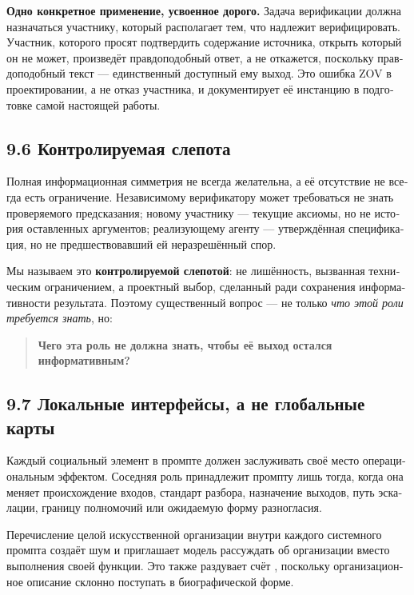 \begin{russian}
\textbf{Одно конкретное применение, усвоенное дорого.} Задача верификации должна назначаться участнику, который располагает тем, что надлежит верифицировать. Участник, которого просят подтвердить содержание источника, открыть который он не может, произведёт правдоподобный ответ, а не откажется, поскольку правдоподобный текст — единственный доступный ему выход. Это ошибка ZOV в проектировании, а не отказ участника, и  документирует её инстанцию в подготовке самой настоящей работы.


\subsection*{9.6 Контролируемая слепота}
\label{sec:ru:9.6}

Полная информационная симметрия не всегда желательна, а её отсутствие не всегда есть ограничение. Независимому верификатору может требоваться не знать проверяемого предсказания; новому участнику — текущие аксиомы, но не история оставленных аргументов; реализующему агенту — утверждённая спецификация, но не предшествовавший ей неразрешённый спор.

Мы называем это \textbf{контролируемой слепотой}: не лишённость, вызванная техническим ограничением, а проектный выбор, сделанный ради сохранения информативности результата. Поэтому существенный вопрос — не только \emph{что этой роли требуется знать}, но:

\begin{quote}
\textbf{Чего эта роль не должна знать, чтобы её выход остался информативным?}
\end{quote}

\subsection*{9.7 Локальные интерфейсы, а не глобальные карты}
\label{sec:ru:9.7}

Каждый социальный элемент в промпте должен заслуживать своё место операциональным эффектом. Соседняя роль принадлежит промпту лишь тогда, когда она меняет происхождение входов, стандарт разбора, назначение выходов, путь эскалации, границу полномочий или ожидаемую форму разногласия.

Перечисление целой искусственной организации внутри каждого системного промпта создаёт шум и приглашает модель рассуждать об организации вместо выполнения своей функции. Это также раздувает счёт , поскольку организационное описание склонно поступать в биографической форме.


\end{russian}
